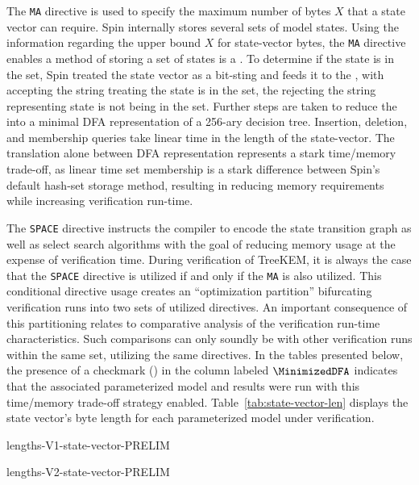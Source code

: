 The \texttt{MA} directive is used to specify the maximum number of bytes \(X\) that a state vector can require.
Spin internally stores several sets of model states.
Using the information regarding the upper bound \(X\) for state-vector bytes, the \texttt{MA} directive enables a method of storing a set of states is a  \autocite{holzmann1999minimized}.
To determine if the state is in the set, Spin treated the state vector as a bit-sting and feeds it to the , with  accepting the string treating the state is in the set, the  rejecting the string representing state is not being in the set.
Further steps are taken to reduce the  into a minimal DFA representation of a 256-ary decision tree.
Insertion, deletion, and membership queries take linear time in the length of the state-vector.
The translation alone between DFA representation represents a stark time/memory trade-off, as linear time set membership is a stark difference between Spin's default hash-set storage method, resulting in reducing memory requirements while increasing verification run-time.

The \texttt{SPACE} directive instructs the compiler to encode the state transition graph as well as select search algorithms with the goal of reducing memory usage at the expense of verification time.
During verification of TreeKEM, it is always the case that the \texttt{SPACE} directive is utilized if and only if the \texttt{MA} is also utilized.
This conditional directive usage creates an ``optimization partition'' bifurcating verification runs into two sets of utilized directives.
An important consequence of this partitioning relates to comparative analysis of the verification run-time characteristics.
Such comparisons can only soundly be with other verification runs within the same set, utilizing the same directives.
In the tables presented below, the presence of a checkmark (\cmark) in the column labeled $\MinimizedDFA$ indicates that the associated parameterized model and results were run with this time/memory trade-off strategy enabled.
Table\ \ref{tab:state-vector-len} displays the state vector's byte length for each \CGKAmod{\VersionOne}{}{} parameterized model under verification.

\begin{table}[ht!]
\caption[State vector byte length for each model]{%
\label{tab:state-vector-len}%
State vector byte length for each model parameterization of \CGKAmod{\VersionOne}{}{} and \CGKAmod{\VersionTwo}{}{}.
}%
\hfill
\begin{minipage}{0.45\textwidth}
  \centering
  {lengths-V1-state-vector-PRELIM}
\end{minipage}
\begin{minipage}{0.45\textwidth}
  \centering
  {lengths-V2-state-vector-PRELIM}
\end{minipage}
\hfill
\end{table}

